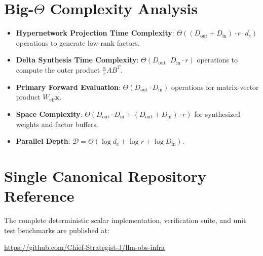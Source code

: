 \documentclass[11pt,a4paper]{article}
\theoremstyle{definition}
\begin{document}
\section{Big-$\Theta$ Complexity Analysis}

\begin{itemize}
    \item \textbf{Hypernetwork Projection Time Complexity}: $\Theta((D_{\text{out}} + D_{\text{in}}) \cdot r \cdot d_c)$ operations to generate low-rank factors.
    \item \textbf{Delta Synthesis Time Complexity}: $\Theta(D_{\text{out}} \cdot D_{\text{in}} \cdot r)$ operations to compute the outer product $\frac{\alpha}{r} A B^T$.
    \item \textbf{Primary Forward Evaluation}: $\Theta(D_{\text{out}} \cdot D_{\text{in}})$ operations for matrix-vector product $W_{\text{eff}} \mathbf{x}$.
    \item \textbf{Space Complexity}: $\Theta(D_{\text{out}} \cdot D_{\text{in}} + (D_{\text{out}} + D_{\text{in}}) \cdot r)$ for synthesized weights and factor buffers.
    \item \textbf{Parallel Depth}: $\mathcal{D} = \Theta(\log d_c + \log r + \log D_{\text{in}})$.
\end{itemize}

\section{Single Canonical Repository Reference}

The complete deterministic scalar implementation, verification suite, and unit test benchmarks are published at:
\begin{center}
\url{https://github.com/Chief-Strategist-J/llm-obs-infra}
\end{center}
\end{document}

